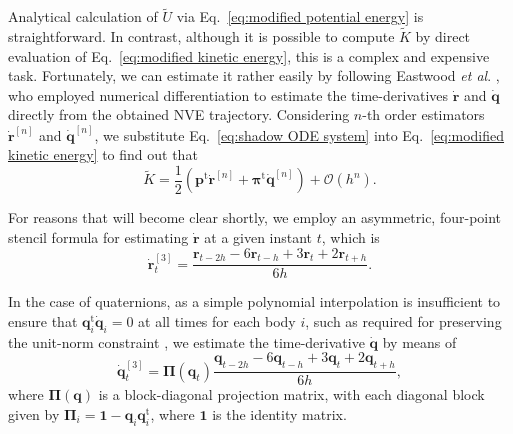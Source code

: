 \documentclass[
	aip,
	jcp,
	reprint,
]{revtex4-1}
\newcommand{\mt}[1]{\boldsymbol{\mathbf{#1}}}          %
\newcommand{\vt}[1]{\boldsymbol{\mathbf{#1}}}          %
\newcommand{\tr}[1]{#1^\text{t}}                       %
\newcommand{\timestep}{h}
\newcommand{\refined}[1]{\widetilde{#1}}
\begin{document}
Analytical calculation of $\refined U$ via Eq.~\eqref{eq:modified potential energy} is straightforward.
In contrast, although it is possible to compute $\refined K$ by direct evaluation of Eq.~\eqref{eq:modified kinetic energy}, this is a complex and expensive task.
Fortunately, we can estimate it rather easily by following Eastwood \textit{et al}. \cite{Eastwood_2010}, who employed numerical differentiation to estimate the time-derivatives $\dot{\vt r}$ and $\dot{\vt q}$ directly from the obtained NVE trajectory.
Considering $n$-th order estimators $\dot{\vt r}^{[n]}$ and $\dot{\vt q}^{[n]}$, we substitute Eq.~\eqref{eq:shadow ODE system} into Eq.~\eqref{eq:modified kinetic energy} to find out that
\begin{equation}
\label{eq:modified kinetic energy estimator}
\refined K = \frac{1}{2} \left( \tr{\vt p} \dot{\vt r}^{[n]} + \tr{\vt \pi} \dot{\vt q}^{[n]} \right) + \mathcal{O}(\timestep^n).
\end{equation}

For reasons that will become clear shortly, we employ an asymmetric, four-point stencil formula for estimating $\dot{\vt r}$ at a given instant $t$, which is
\begin{equation*}
\dot{\vt r}^{[3]}_t = \frac{{\vt r}_{t-2\timestep} - 6 {\vt r}_{t-\timestep} + 3 {\vt r}_t + 2 {\vt r}_{t+\timestep}}{6\timestep}.
\end{equation*}

In the case of quaternions, as a simple polynomial interpolation is insufficient to ensure that $\tr{\vt q}_i \dot{\vt q}_i = 0$ at all times for each body $i$, such as required for preserving the unit-norm constraint \cite{Silveira_2017}, we estimate the time-derivative $\dot{\vt q}$ by means of \cite{Schay_1995}
\begin{equation*}
\dot{\vt q}^{[3]}_t = {\mt \Pi}({\vt q}_t) \frac{{\vt q}_{t-2\timestep} - 6 {\vt q}_{t-\timestep} + 3 {\vt q}_t + 2 {\vt q}_{t+\timestep}}{6\timestep},
\end{equation*}
where ${\mt \Pi}(\vt q)$ is a block-diagonal projection matrix, with each diagonal block given by ${\mt \Pi}_i = {\mt 1} - {\vt q}_i \tr{\vt q}_i$, where $\mt 1$ is the identity matrix.
\end{document}
